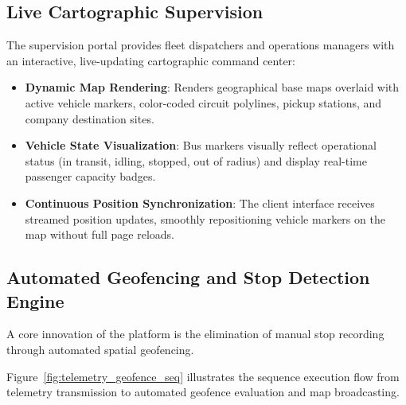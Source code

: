 \subsection{Live Cartographic Supervision}
The supervision portal provides fleet dispatchers and operations managers with an interactive, live-updating cartographic command center:
\begin{itemize}
  \item \textbf{Dynamic Map Rendering}: Renders geographical base maps overlaid with active vehicle markers, color-coded circuit polylines, pickup stations, and company destination sites.
  \item \textbf{Vehicle State Visualization}: Bus markers visually reflect operational status (in transit, idling, stopped, out of radius) and display real-time passenger capacity badges.
  \item \textbf{Continuous Position Synchronization}: The client interface receives streamed position updates, smoothly repositioning vehicle markers on the map without full page reloads.
\end{itemize}

\subsection{Automated Geofencing and Stop Detection Engine}
A core innovation of the platform is the elimination of manual stop recording through automated spatial geofencing.

Figure~\ref{fig:telemetry_geofence_seq} illustrates the sequence execution flow from telemetry transmission to automated geofence evaluation and map broadcasting.

